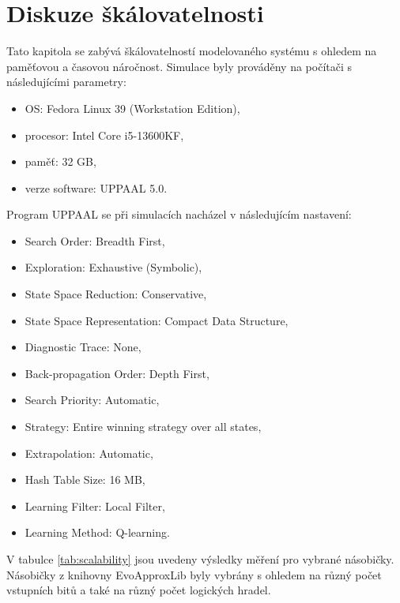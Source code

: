 \chapter{Diskuze škálovatelnosti} 
\label{skalovatelnost}
Tato kapitola se zabývá škálovatelností modelovaného systému s ohledem na paměťovou a časovou náročnost. Simulace byly prováděny na počítači s následujícími parametry:
\begin{itemize}
    \item OS: Fedora Linux 39 (Workstation Edition),
    \item procesor: Intel Core i5-13600KF,
    \item paměť: 32 GB,
    \item verze software: UPPAAL 5.0.
\end{itemize}
Program UPPAAL se při simulacích nacházel v následujícím nastavení:
\begin{itemize}
    \item Search Order: Breadth First,
    \item Exploration: Exhaustive (Symbolic),
    \item State Space Reduction: Conservative,
    \item State Space Representation: Compact Data Structure,
    \item Diagnostic Trace: None,
    \item Back-propagation Order: Depth First,
    \item Search Priority: Automatic,
    \item Strategy: Entire winning strategy over all states,
    \item Extrapolation: Automatic,
    \item Hash Table Size: 16 MB,
    \item Learning Filter: Local Filter,
    \item Learning Method: Q-learning.
\end{itemize}
\pagebreak
V tabulce \ref{tab:scalability} jsou uvedeny výsledky měření pro vybrané násobičky. Násobičky z knihovny EvoApproxLib byly vybrány s ohledem na různý počet vstupních bitů a také na různý počet logických hradel. 

